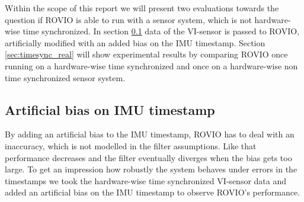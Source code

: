 Within the scope of this report we will present two evaluations towards the question if ROVIO is able to run with a sensor system, which is not hardware-wise time synchronized. In section \ref{sec:timesync_artificial} data of the VI-sensor is passed to ROVIO, artificially modified with an added bias on the IMU timestamp. Section \ref{sec:timesync_real} will show experimental results by comparing ROVIO once running on a hardware-wise time synchronized and once on a hardware-wise non time synchronized sensor system.


\subsection{Artificial bias on IMU timestamp}
\label{sec:timesync_artificial}

By adding an artificial bias to the IMU timestamp, ROVIO has to deal with an inaccuracy, which is not modelled in the filter assumptions. Like that performance decreases and the filter eventually diverges when the bias gets too large. To get an impression how robustly the system behaves under errors in the timestamps we took the hardware-wise time synchronized VI-sensor data and added an artificial bias on the IMU timestamp to observe ROVIO's performance. \\

